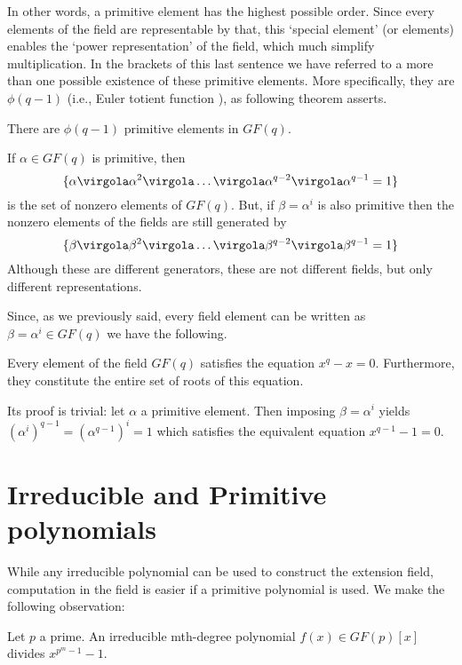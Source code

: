 In other words, a primitive element has the highest possible order. Since every elements of the field are representable by that, this `special element' (or elements) enables the `power representation' of the field, which much simplify multiplication.
In the brackets of this last sentence we have referred to a more than one possible existence of these primitive elements. More specifically, they are \( \phi(q-1) \) (i.e., Euler totient function \cite{b:moon}), as following theorem asserts.


\begin{Theorem}
There are $\phi(q-1)$ primitive elements in $GF(q)$.
\end{Theorem}

If \(\alpha \in GF(q)\) is primitive, then
\[
\{\alpha \virgola \alpha^2 \virgola \ldots \virgola \alpha^{q-2} \virgola \alpha^{q-1}=1 \}
\]
is the set of nonzero elements of \(GF(q)\). But, if \(\beta=\alpha^i\) is also primitive then the nonzero elements of the fields are still generated by
\[
\{\beta \virgola \beta^2 \virgola \ldots \virgola \beta^{q-2} \virgola \beta^{q-1}=1 \}
\]
Although these are different generators, these are not different fields, but only different representations.

Since, as we previously said, every field element can be written as \(\beta=\alpha^i \in GF(q) \) we have the following.

\begin{Theorem}
Every element of the field $GF(q)$ satisfies the equation \(x^q-x=0\). Furthermore, they constitute the entire set of roots of this equation. \label{th:roots}
\end{Theorem}
Its proof is trivial: let $\alpha$ a primitive element. Then imposing \(\beta = \alpha^i \) yields \( {(\alpha^i)}^{q-1} = {(\alpha^{q-1})}^{i} =1 \) which satisfies the equivalent equation \(x^{q-1}-1=0\).
\label{th:FieldGFBuild}


\section{Irreducible and Primitive polynomials} \label{sec:primpoly}

While any irreducible polynomial can be used to construct the extension field, computation in the field is easier if a primitive polynomial is used. We make the following observation:

\begin{Theorem}
Let $p$ a prime. An irreducible mth-degree polynomial $f(x) \in GF(p)[x] $ divides \( x^{p^m-1}-1\).
\end{Theorem}

